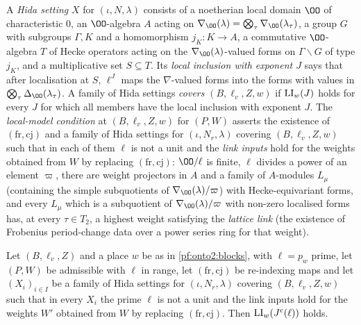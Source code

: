 \begin{definition}\label{pf:onto2:hida}
A \emph{Hida setting} $X$ for $(\iota,N,\lambda)$ consists of
a noetherian local domain $\OO$ of characteristic $0$, an $\OO$-algebra $A$ acting on $\nabla_\OO(\lambda)=\bigotimes_\tau\nabla_\OO(\lambda_\tau)$,
a group $G$ with subgroups $\Gamma,K$ and a homomorphism $j_K:K\to A$, a commutative $\OO$-algebra $T$ of Hecke operators acting on the
$\nabla_\OO(\lambda)$-valued forms on $\Gamma\backslash G$ of type $j_K$, and a multiplicative set $S\subseteq T$. Its \emph{local
inclusion with exponent $J$} says that after localisation at $S$,
$\ell^J$ maps the $\nabla$-valued forms into the forms with values in $\bigotimes_\tau\Delta_\OO(\lambda_\tau)$. A family of Hida settings
\emph{covers} $(B,\ell_v,Z,w)$ if $\mathrm{LI}_w(J)$ holds for every $J$ for which all members have
the local inclusion with exponent $J$. The \emph{local-model condition} at $(B,\ell_v,Z,w)$ for $(P,W)$
asserts the existence of $(\mathrm{fr},\mathrm{cj})$ and a family of Hida settings for
$(\iota,N_r,\lambda)$ covering $(B,\ell_v,Z,w)$ such that in each of them $\ell$ is not a unit and the \emph{link inputs}
hold for the weights obtained from $W$ by replacing
$(\mathrm{fr},\mathrm{cj})$: $\OO/\ell$ is finite, $\ell$ divides a power of an element $\varpi$, there are weight projectors in $A$ and a
family of $A$-modules $L_\mu$ (containing the simple subquotients of $\nabla_\OO(\lambda)/\varpi$) with Hecke-equivariant forms, and every
$L_\mu$ which is a subquotient of $\nabla_\OO(\lambda)/\varpi$ with non-zero localised forms has, at every $\tau\in T_2$, a highest weight
satisfying the \emph{lattice link} (the existence of Frobenius period-change data over a power series ring for that weight).
\end{definition}

\begin{proposition}\label{pf:onto2:lincl}
Let $(B,\ell_v,Z)$ and a place $w$ be as in \cref{pf:onto2:blocks}, with $\ell=p_w$ prime, let $(P,W)$ be admissible with $\ell$ in
range, let $(\mathrm{fr},\mathrm{cj})$ be re-indexing maps and let $(X_i)_{i\in I}$ be a family of Hida settings for $(\iota,N_r,\lambda)$
covering $(B,\ell_v,Z,w)$ such that in every $X_i$ the prime $\ell$ is not a unit and the link inputs hold for the weights $W'$
obtained from $W$ by replacing $(\mathrm{fr},\mathrm{cj})$. Then $\mathrm{LI}_w(J^{\mathrm c}(\ell))$ holds.
\end{proposition}

